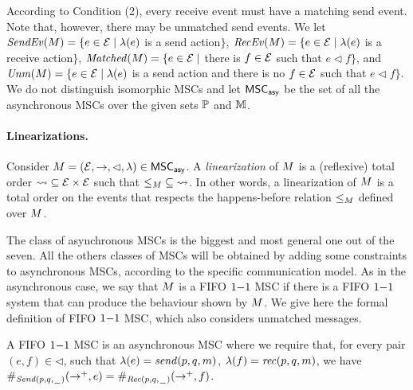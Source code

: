 According to Condition (2), every receive event must have a matching send event. Note that, however, there may be unmatched send events.
We let
$\SendEv{\msc} = \{e \in \Events \mid \lambda(e)$ is a send
action$\}$,
$\RecEv{\msc} = \{e \in \Events \mid \lambda(e)$ is a receive
action$\}$,
$\Matched{\msc} = \{e \in \Events \mid$ there is $f \in \Events$
such that $e \lhd f\}$, and
$\Unm{\msc} = \{e \in \Events \mid \lambda(e)$ is a send
action and there is no $f \in \Events$ such that $e \lhd f\}$.
%
We do not distinguish isomorphic MSCs and
let $\asMSCs$ be the set of all the asynchronous MSCs over the given sets $\Procs$ and $\Msg$.



\paragraph*{Linearizations.}

Consider $\msc = (\Events,\procrel,\lhd,\lambda) \in \asMSCs$.
A \emph{linearization} of $\msc$ is a (reflexive) total order ${\linrel} \subseteq \Events \times \Events$ such that ${\le_\msc} \subseteq {\linrel}$. In other words, a linearization of $\msc$ is a total order on the events that respects the happens-before relation $\le_\msc$ defined over $\msc$.

\medskip

The class of asynchronous MSCs is the biggest and most general one out of the seven. All the others classes of MSCs will be obtained by adding some constraints to asynchronous MSCs, according to the specific communication model. As in the asynchronous case, we say that $\msc$ is a FIFO $\oneone$ MSC if there is a FIFO $\oneone$ system that can produce the behaviour shown by $\msc$. We give here the formal definition of FIFO $\oneone$ MSC, which also considers unmatched messages.

\begin{definition}
A FIFO $\oneone$ MSC is an asynchronous MSC where we require that, for every pair $(e,f) \in {\lhd}$, such that $\lambda(e) = \sact{p}{q}{\msg}$, $\lambda(f) = \ract{p}{q}{\msg}$, we have $\sametype{e}{\pqsAct{p}{q}}{\procrel^+} = \sametype{f}{\pqrAct{p}{q}}{\procrel^+}$.
\end{definition}

